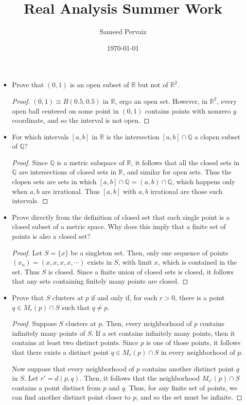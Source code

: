 \documentclass[11pt,a4paper]{article}
\title{Real Analysis Summer Work}
\author{Sameed Pervaiz}
\date{\today}
\newcommand{\pnum}[1]{\item[\textbf{#1}]}
\newcommand{\Q}{\mathbb{Q}}
\newcommand{\R}{\mathbb{R}}
\begin{document}
\maketitle

\begin{itemize}
	\pnum{2.1} Prove that $(0,1)$ is an open subset of $\R$ but not of $\R^2$.
	\begin{proof}
		$(0,1) \equiv B(0.5, 0.5)$ in $\R$, ergo an open set. However, in $\R^2$,
		every open ball centered on some point in $(0,1)$ contains points with nonzero $y$
		coordinate, and so the interval is not open.
	\end{proof}

	\pnum{2.2} For which intervals $[a,b]$ in $\R$ is the intersection $[a,b] \cap \Q$ a clopen subset
	of $\Q$?
	\begin{proof}
		Since $\Q$ is a metric subspace of $\R$, it follows that all the closed sets in $\Q$
		are intersections of closed sets in $\R$, and similar for open sets. Thus the clopen sets are
		sets in which $[a,b] \cap \Q = (a,b) \cap \Q$, which happens only when $a,b$ are irrational.
		Thus $[a,b]$ with $a,b$ irrational are those such intervals.
	\end{proof}

	\pnum{2.3} Prove directly from the definition of closed set that each single point is a closed
	subset of a metric space. Why does this imply that a finite set of points is also a closed set?
	\begin{proof}
		Let $S=\{x\}$ be a singleton set. Then, only one sequence of points $(x_n)=(x,x,x,x,\cdots)$
		exists in $S$, with limit $x$, which is contained in the set. Thus $S$ is closed. Since a
		finite union of closed sets is closed, it follows that any sets containing finitely many
		points are closed.
	\end{proof}

	\pnum{2.4} Prove that $S$ clusters at $p$ if and only if, for each $r > 0$, there is a point
	$q \in M_{r}(p) \cap S$ such that $q \neq p$.
	\begin{proof}
	Suppose $S$ clusters at $p$. Then, every neighborhood of $p$ contains infinitely many points of $S$.
	If a set contains infinitely many points, then it contains at least two distinct points. Since $p$
	is one of those points, it follows that there exists a distinct point $q\in M_r(p)\cap S$ in every
	neighborhood of $p$.

	Now suppose that every neighborhood of $p$ contains another distinct point $q$ in $S$. Let
	$r' = d(p,q)$. Then, it follows that the neighborhood $M_{r'}(p) \cap S$ contains a point distinct
	from $p$ and $q$. Thus, for any finite set of points, we can find another distinct point closer to
	$p$, and so the set must be infinite.
	\end{proof}


\end{itemize}
\end{document}
